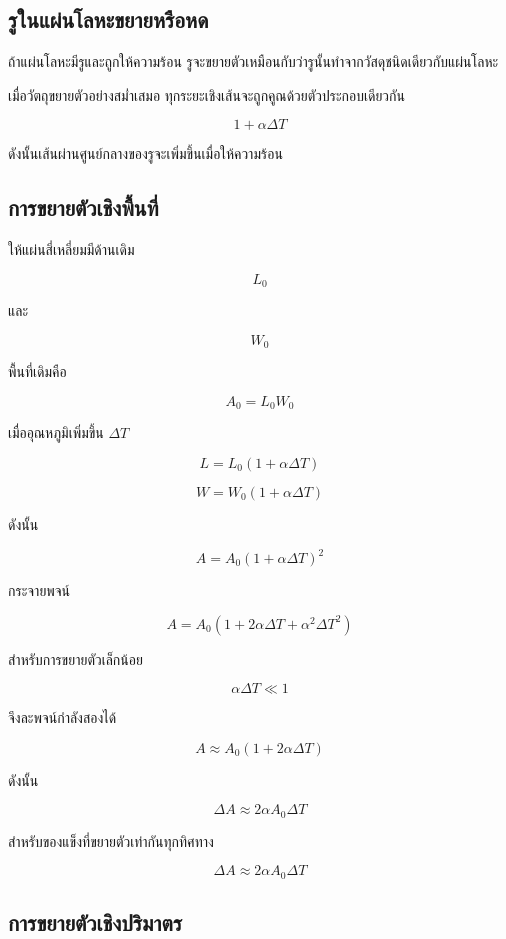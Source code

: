 \subsection{รูในแผ่นโลหะขยายหรือหด}

ถ้าแผ่นโลหะมีรูและถูกให้ความร้อน รูจะขยายตัวเหมือนกับว่ารูนั้นทำจากวัสดุชนิดเดียวกับแผ่นโลหะ

\begin{tcolorbox}[title=หลักของรูในวัตถุ]
เมื่อวัตถุขยายตัวอย่างสม่ำเสมอ ทุกระยะเชิงเส้นจะถูกคูณด้วยตัวประกอบเดียวกัน

\[
1+\alpha\Delta T
\]

ดังนั้นเส้นผ่านศูนย์กลางของรูจะเพิ่มขึ้นเมื่อให้ความร้อน
\end{tcolorbox}

\subsection{การขยายตัวเชิงพื้นที่}

ให้แผ่นสี่เหลี่ยมมีด้านเดิม

\[
L_0
\]

และ

\[
W_0
\]

พื้นที่เดิมคือ

\[
A_0=L_0W_0
\]

เมื่ออุณหภูมิเพิ่มขึ้น $\Delta T$

\[
L=L_0(1+\alpha\Delta T)
\]

\[
W=W_0(1+\alpha\Delta T)
\]

ดังนั้น

\[
A=A_0(1+\alpha\Delta T)^2
\]

กระจายพจน์

\[
A=A_0\left(1+2\alpha\Delta T+\alpha^2\Delta T^2\right)
\]

สำหรับการขยายตัวเล็กน้อย

\[
\alpha\Delta T\ll 1
\]

จึงละพจน์กำลังสองได้

\[
A\approx A_0(1+2\alpha\Delta T)
\]

ดังนั้น

\[
\Delta A\approx 2\alpha A_0\Delta T
\]

\begin{tcolorbox}[title=การขยายตัวเชิงพื้นที่]
สำหรับของแข็งที่ขยายตัวเท่ากันทุกทิศทาง

\[
\boxed{\Delta A\approx 2\alpha A_0\Delta T}
\]
\end{tcolorbox}

\subsection{การขยายตัวเชิงปริมาตร}

